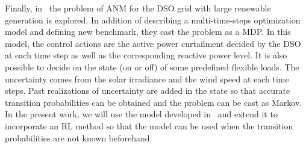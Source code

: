 Finally, in~\cite{Gemine} the problem of ANM for the DSO grid with large renewable generation is explored.
In addition of describing a multi-time-steps optimization model and defining new benchmark, they cast the problem as a MDP.
In this model, the control actions are the active power curtailment decided by the DSO at each time step as well as the corresponding reactive power level.
It is also possible to decide on the state (on or off) of some predefined flexible loads.
The uncertainty comes from the solar irradiance and the wind speed at each time steps.
Past realizations of uncertainty are added in the state so that accurate transition probabilities can be obtained and the problem can be cast as Markov.
In the present work, we will use the model developed in~\cite{Gemine} and extend it to incorporate an RL method so that the model can be used when the transition probabilities are not known beforehand.
